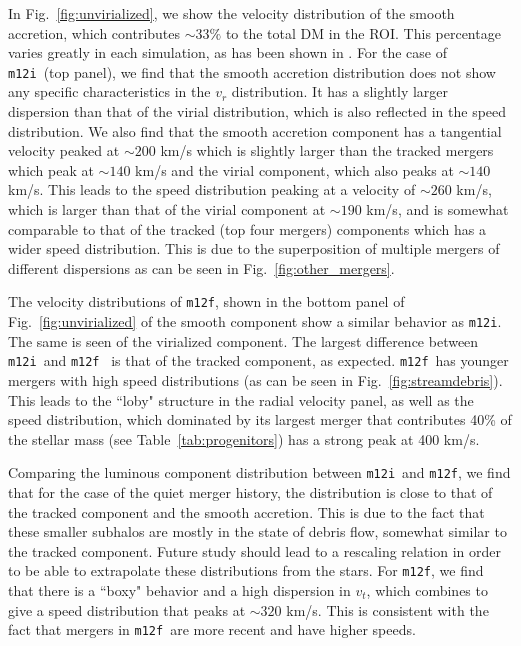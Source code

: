 \documentclass[twocolumn,preprintnumbers]{aastex6}
\DeclareRobustCommand{\Tab}[1]{Table~\ref{#1}}
\DeclareRobustCommand{\Fig}[1]{Fig.~\ref{#1}}
\newcommand{\mi}{\texttt{m12i}}
\newcommand{\mf}{\texttt{m12f}}
\begin{document}
In \Fig{fig:unvirialized}, we show the velocity distribution of the smooth accretion, which contributes $\sim 33\%$ to the total DM in the ROI. This percentage varies greatly in each simulation, as has been shown in \cite{2011MNRAS.413.1373W}. For the case of \mi~(top panel), we find that the smooth accretion distribution does not show any specific characteristics in the $v_r$ distribution. It has a slightly larger dispersion than that of the virial distribution, which is also reflected in the speed distribution. We also find that the smooth accretion component has a tangential velocity peaked at $\sim 200$ km/s which is slightly larger than the tracked mergers which peak at $\sim 140$ km/s and the virial component, which also peaks at $\sim 140$ km/s. This leads to the speed distribution peaking at a velocity of $\sim 260$ km/s, which is larger than that of the virial component at $\sim 190$ km/s, and is somewhat comparable to that of the tracked (top four mergers) components which has a wider speed distribution. This is due to the superposition of multiple mergers of different dispersions as can be seen in \Fig{fig:other_mergers}.

The velocity distributions of \mf, shown in the bottom panel of  \Fig{fig:unvirialized} of the smooth component show a similar behavior as \mi. The same is seen of the virialized component. The largest difference between \mi~and \mf~ is that of the tracked component, as expected. \mf~has younger mergers with high speed distributions (as can be seen in \Fig{fig:streamdebris}). This leads to the ``loby" structure in the radial velocity panel, as well as the speed distribution, which dominated by its largest merger that contributes 40\% of the stellar mass (see \Tab{tab:progenitors}) has a strong peak at 400 km/s. 

Comparing the luminous component distribution between \mi~and \mf, we find that for the case of the quiet merger history, the distribution is close to that of the tracked component and the smooth accretion. This is due to the fact that these smaller subhalos are mostly in the state of debris flow, somewhat similar to the tracked component. Future study should lead to a rescaling relation in order to be able to extrapolate these distributions from the stars. For \mf, we find that there is a ``boxy" behavior and a high dispersion in $v_t$, which combines to give a speed distribution that peaks at $\sim 320$ km/s. This is consistent with the fact that mergers in \mf~are more recent and have higher speeds. 
\end{document}
